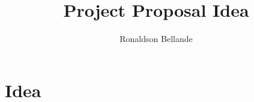 \documentclass[11pt]{article}
\title{\textbf{Project Proposal Idea}}
\author{Ronaldson Bellande}
\date{}
\begin{document}
\maketitle
\thispagestyle{empty}

\section{Idea}
\end{document}
